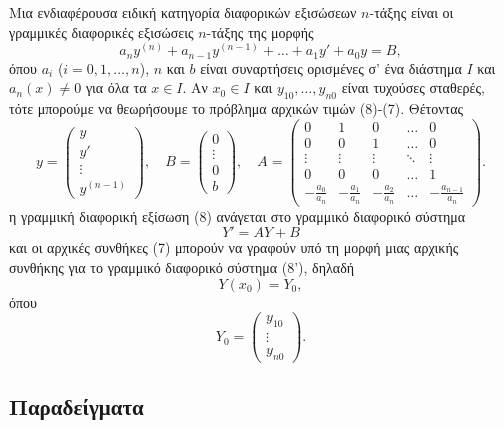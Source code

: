 \documentclass[11pt,a4paper,twoside]{book}
\begin{document}
Μια ενδιαφέρουσα ειδική κατηγορία διαφορικών εξισώσεων $n$-τάξης είναι οι γραμμικές διαφορικές εξισώσεις $n$-τάξης της μορφής
\begin{equation}
a_n y^{(n)} + a_{n-1} y^{(n-1)} + \dots + a_1 y' + a_0 y = B,
\end{equation}
όπου $a_i$ ($i=0,1,\dots,n$), $n$ και $b$ είναι συναρτήσεις ορισμένες σ' ένα διάστημα $I$ και $a_n(x) \neq 0$ για όλα τα $x \in I$. Αν $x_0 \in I$ και $y_{10}, \dots, y_{n0}$ είναι τυχούσες σταθερές, τότε μπορούμε να θεωρήσουμε το πρόβλημα αρχικών τιμών (8)-(7). Θέτοντας
\[
y = \begin{pmatrix} y \\ y' \\ \vdots \\ y^{(n-1)} \end{pmatrix}, \quad B = \begin{pmatrix} 0 \\ \vdots \\ 0 \\ b \end{pmatrix}, \quad A = \begin{pmatrix} 0 & 1 & 0 & \dots & 0 \\ 0 & 0 & 1 & \dots & 0 \\ \vdots & \vdots & \vdots & \ddots & \vdots \\ 0 & 0 & 0 & \dots & 1 \\ -\frac{a_0}{a_n} & -\frac{a_1}{a_n} & -\frac{a_2}{a_n} & \dots & -\frac{a_{n-1}}{a_n} \end{pmatrix}.
\]
η γραμμική διαφορική εξίσωση (8) ανάγεται στο γραμμικό διαφορικό σύστημα
\begin{equation*} \label{eq:8prime}
Y' = AY+B \tag{8'}
\end{equation*}
και οι αρχικές συνθήκες (7) μπορούν να γραφούν υπό τη μορφή μιας αρχικής συνθήκης για το γραμμικό διαφορικό σύστημα (8'), δηλαδή
\begin{equation*} \label{eq:7primeprime}
Y(x_0) = Y_0, \tag{7''}
\end{equation*}
όπου
\[
Y_0 = \begin{pmatrix} y_{10} \\ \vdots \\ y_{n0} \end{pmatrix}.
\]

\subsection{Παραδείγματα}
\end{document}

